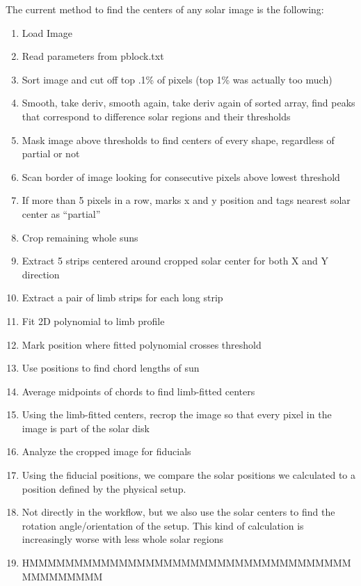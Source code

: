 \documentclass[10pt]{scrartcl}
\begin{document}
The current method to find the centers of any solar image is the following:

\begin{enumerate}
    \item Load Image
    \item Read parameters from pblock.txt
    \item Sort image and cut off top .1\% of pixels (top 1\% was actually too much)
    \item Smooth, take deriv, smooth again, take deriv again of sorted array, find peaks that correspond to difference solar regions and their thresholds
    \item Mask image above thresholds to find centers of every shape, regardless of partial or not
    \item Scan border of image looking for consecutive pixels above lowest threshold
    \item If more than 5 pixels in a row, marks x and y position and tags nearest solar center as ``partial''
    \item Crop remaining whole suns
    \item Extract 5 strips centered around cropped solar center for both X and Y direction
    \item Extract a pair of limb strips for each long strip
    \item Fit 2D polynomial to limb profile
    \item Mark position where fitted polynomial crosses threshold 
    \item Use positions to find chord lengths of sun
    \item Average midpoints of chords to find limb-fitted centers
    \item Using the limb-fitted centers, recrop the image so that every pixel in the image is part of the solar disk
    \item Analyze the cropped image for fiducials
    \item Using the fiducial positions, we compare the solar positions we calculated to a position defined by the physical setup.
    \item Not directly in the workflow, but we also use the solar centers to find the rotation angle/orientation of the setup. This kind of calculation is increasingly worse with less whole solar regions
    \item HMMMMMMMMMMMMMMMMMMMMMMMMMMMMMMMMMMMMMMMMMMMMM
\end{enumerate}
\end{document}
